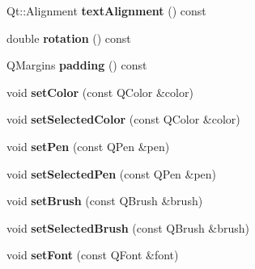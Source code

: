 \begin{DoxyCompactItemize}
\item 
Qt\+::\+Alignment {\bfseries text\+Alignment} () const \hypertarget{class_q_c_p_item_text_aaa1d84b3f61f9f2a0cce230e66ef7194}{}\label{class_q_c_p_item_text_aaa1d84b3f61f9f2a0cce230e66ef7194}

\item 
double {\bfseries rotation} () const \hypertarget{class_q_c_p_item_text_ae8991207fa1697511c1c8af9f3ca0e0a}{}\label{class_q_c_p_item_text_ae8991207fa1697511c1c8af9f3ca0e0a}

\item 
Q\+Margins {\bfseries padding} () const \hypertarget{class_q_c_p_item_text_a00e0fa03822ff384bf4921c1c90322ff}{}\label{class_q_c_p_item_text_a00e0fa03822ff384bf4921c1c90322ff}

\item 
void {\bfseries set\+Color} (const Q\+Color \&color)\hypertarget{class_q_c_p_item_text_aa51efc0841fe52da9eaf8aff6fc8a8b2}{}\label{class_q_c_p_item_text_aa51efc0841fe52da9eaf8aff6fc8a8b2}

\item 
void {\bfseries set\+Selected\+Color} (const Q\+Color \&color)\hypertarget{class_q_c_p_item_text_ae7ba0bdb75c897b028388e45bfd435fa}{}\label{class_q_c_p_item_text_ae7ba0bdb75c897b028388e45bfd435fa}

\item 
void {\bfseries set\+Pen} (const Q\+Pen \&pen)\hypertarget{class_q_c_p_item_text_a9b9ec6eea0eb0603977ff84d4c78d0a3}{}\label{class_q_c_p_item_text_a9b9ec6eea0eb0603977ff84d4c78d0a3}

\item 
void {\bfseries set\+Selected\+Pen} (const Q\+Pen \&pen)\hypertarget{class_q_c_p_item_text_a291febe586f0da3f1c392e77bef4aa20}{}\label{class_q_c_p_item_text_a291febe586f0da3f1c392e77bef4aa20}

\item 
void {\bfseries set\+Brush} (const Q\+Brush \&brush)\hypertarget{class_q_c_p_item_text_a1c7e131516df2ed8d941ef31240ded8e}{}\label{class_q_c_p_item_text_a1c7e131516df2ed8d941ef31240ded8e}

\item 
void {\bfseries set\+Selected\+Brush} (const Q\+Brush \&brush)\hypertarget{class_q_c_p_item_text_a6b8377eeb2af75eb9528422671ac16cb}{}\label{class_q_c_p_item_text_a6b8377eeb2af75eb9528422671ac16cb}

\item 
void {\bfseries set\+Font} (const Q\+Font \&font)\hypertarget{class_q_c_p_item_text_a94ad60ebe04f5c07c35e7c2029e96b1f}{}\label{class_q_c_p_item_text_a94ad60ebe04f5c07c35e7c2029e96b1f}


\end{DoxyCompactItemize}
